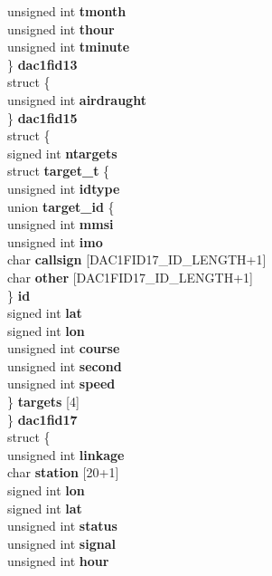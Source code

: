 \begin{DoxyCompactItemize}
{\begin{tabbing}
{\>\>\>\>unsigned int {\bfseries tmonth}\\
\>\>\>\>unsigned int {\bfseries thour}\\
\>\>\>\>unsigned int {\bfseries tminute}\\
\>\>\>\} {\bfseries dac1fid13}\\
\>\>\>struct \{\\
\>\>\>\>unsigned int {\bfseries airdraught}\\
\>\>\>\} {\bfseries dac1fid15}\\
\>\>\>struct \{\\
\>\>\>\>signed int {\bfseries ntargets}\\
\>\>\>\>struct {\bfseries target\_t} \{\\
\>\>\>\>\>unsigned int {\bfseries idtype}\\
\>\>\>\>\>union {\bfseries target\_id} \{\\
\>\>\>\>\>\>unsigned int {\bfseries mmsi}\\
\>\>\>\>\>\>unsigned int {\bfseries imo}\\
\>\>\>\>\>\>char {\bfseries callsign} \mbox{[}DAC1FID17\_ID\_LENGTH+1\mbox{]}\\
\>\>\>\>\>\>char {\bfseries other} \mbox{[}DAC1FID17\_ID\_LENGTH+1\mbox{]}\\
\>\>\>\>\>\} {\bfseries id}\\
\>\>\>\>\>signed int {\bfseries lat}\\
\>\>\>\>\>signed int {\bfseries lon}\\
\>\>\>\>\>unsigned int {\bfseries course}\\
\>\>\>\>\>unsigned int {\bfseries second}\\
\>\>\>\>\>unsigned int {\bfseries speed}\\
\>\>\>\>\} {\bfseries targets} \mbox{[}4\mbox{]}\\
\>\>\>\} {\bfseries dac1fid17}\\
\>\>\>struct \{\\
\>\>\>\>unsigned int {\bfseries linkage}\\
\>\>\>\>char {\bfseries station} \mbox{[}20+1\mbox{]}\\
\>\>\>\>signed int {\bfseries lon}\\
\>\>\>\>signed int {\bfseries lat}\\
\>\>\>\>unsigned int {\bfseries status}\\
\>\>\>\>unsigned int {\bfseries signal}\\
\>\>\>\>unsigned int {\bfseries hour}\\
}
\end{tabbing}}
\end{DoxyCompactItemize}
